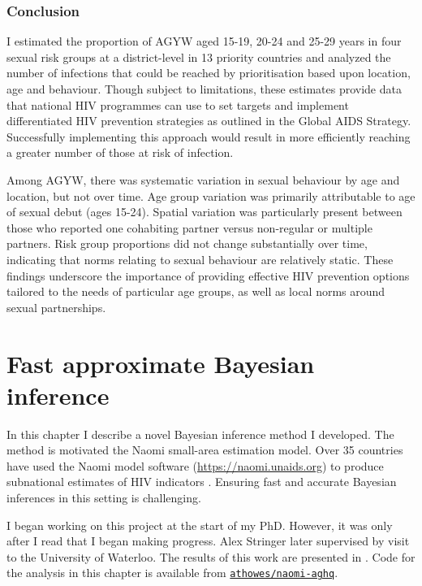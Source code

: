 \documentclass[a4paper, nobind]{templates/ociamthesis}
\begin{document}
\hypertarget{conclusion}{%
\subsection{Conclusion}\label{conclusion}}

I estimated the proportion of AGYW aged 15-19, 20-24 and 25-29 years in four sexual risk groups at a district-level in 13 priority countries and analyzed the number of infections that could be reached by prioritisation based upon location, age and behaviour.
Though subject to limitations, these estimates provide data that national HIV programmes can use to set targets and implement differentiated HIV prevention strategies as outlined in the Global AIDS Strategy.
Successfully implementing this approach would result in more efficiently reaching a greater number of those at risk of infection.

Among AGYW, there was systematic variation in sexual behaviour by age and location, but not over time.
Age group variation was primarily attributable to age of sexual debut (ages 15-24).
Spatial variation was particularly present between those who reported one cohabiting partner versus non-regular or multiple partners.
Risk group proportions did not change substantially over time, indicating that norms relating to sexual behaviour are relatively static.
These findings underscore the importance of providing effective HIV prevention options tailored to the needs of particular age groups, as well as local norms around sexual partnerships.

\hypertarget{naomi-aghq}{%
\chapter{Fast approximate Bayesian inference}\label{naomi-aghq}}

\adjustmtc
{}

In this chapter I describe a novel Bayesian inference method I developed.
The method is motivated the Naomi small-area estimation model.
Over 35 countries have used the Naomi model software (\url{https://naomi.unaids.org}) to produce subnational estimates of HIV indicators \autocite{unaids2023global}.
Ensuring fast and accurate Bayesian inferences in this setting is challenging.

I began working on this project at the start of my PhD.
However, it was only after I read \textcite{stringer2021fast} that I began making progress.
Alex Stringer later supervised by visit to the University of Waterloo.
The results of this work are presented in \textcite{howes2023fast}.
Code for the analysis in this chapter is available from \href{https://github.com/athowes/elgm-inf}{\texttt{athowes/naomi-aghq}}.
\end{document}
